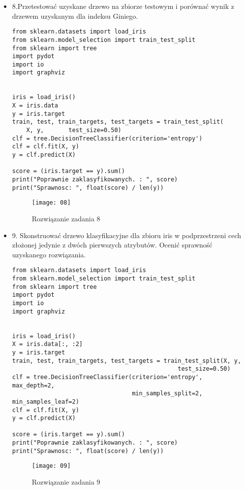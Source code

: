 \documentclass[12pt,a4paper]{article}
\begin{document}
\begin{itemize}
                \item 8.Przetestować uzyskane drzewo na zbiorze testowym i porównać wynik z drzewem uzyskanym dla indeksu Giniego.
	\begin{lstlisting}
from sklearn.datasets import load_iris
from sklearn.model_selection import train_test_split
from sklearn import tree
import pydot
import io
import graphviz


iris = load_iris()
X = iris.data
y = iris.target
train, test, train_targets, test_targets = train_test_split(
    X, y,       test_size=0.50)
clf = tree.DecisionTreeClassifier(criterion='entropy')
clf = clf.fit(X, y)
y = clf.predict(X)

score = (iris.target == y).sum()
print("Poprawnie zaklasyfikowanych. : ", score)
print("Sprawnosc: ", float(score) / len(y))

	\end{lstlisting}
		\begin{figure}[h]
                        \texttt{[image: 08]}
                        \centering
			\caption{Rozwiązanie zadania 8}
			\label{fig:fig8}
                \end{figure}
                \clearpage
                \item 9. Skonstruować drzewo klasyfikacyjne dla zbioru iris w podprzestrzeni cech złożonej jedynie z dwóch pierwszych atrybutów. Ocenić sprawność uzyskanego rozwiązania.
	\begin{lstlisting}
from sklearn.datasets import load_iris
from sklearn.model_selection import train_test_split
from sklearn import tree
import pydot
import io
import graphviz


iris = load_iris()
X = iris.data[:, :2]
y = iris.target 
train, test, train_targets, test_targets = train_test_split(X, y,
                                               test_size=0.50)
clf = tree.DecisionTreeClassifier(criterion='entropy',  max_depth=2,
                                  min_samples_split=2, min_samples_leaf=2)
clf = clf.fit(X, y)
y = clf.predict(X)

score = (iris.target == y).sum()
print("Poprawnie zaklasyfikowanych. : ", score)
print("Sprawnosc: ", float(score) / len(y))

	\end{lstlisting}
		\begin{figure}[h]
                        \texttt{[image: 09]}
                        \centering
			\caption{Rozwiązanie zadania 9}
			\label{fig:fig9}
                \end{figure}
                \clearpage
        \end{itemize}
	
\end{document}
